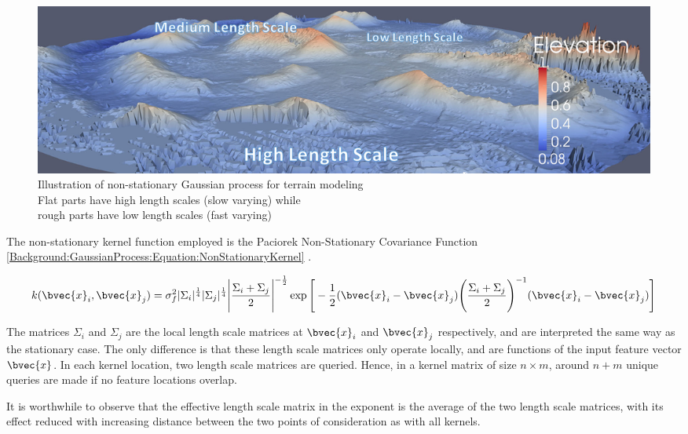 			\begin{figure}[!htbp]
				\centering
					\includegraphics[width=\textwidth]{Figures/gaussianprocesslengthscale.png}
				\caption{Illustration of non-stationary Gaussian process for terrain modeling \cite{GaussianProcessTerrainFigure} \\
				Flat parts have high length scales (slow varying) while \\ rough parts have low length scales (fast varying)}
				\label{Background:GaussianProcess:Figure:gaussianprocesslengthscale}
			\end{figure}
			
			The non-stationary kernel function employed is the Paciorek Non-Stationary Covariance Function \eqref{Background:GaussianProcess:Equation:NonStationaryKernel} \cite{AdaptiveNonStationaryKernel}.
			
			\begin{equation}
				k(\bvec{x}_{i}, \bvec{x}_{j}) = \sigma_{f}^{2} |\Sigma_{i}|^{\frac{1}{4}} |\Sigma_{j}|^{\frac{1}{4}} \Bigg|\frac{\Sigma_{i} + \Sigma_{j}}{2}\Bigg|^{-\frac{1}{2}} \exp\Bigg[ -\frac{1}{2} (\bvec{x}_{i} - \bvec{x}_{j}) \Bigg(\frac{\Sigma_{i} + \Sigma_{j}}{2}\Bigg)^{-1} (\bvec{x}_{i} - \bvec{x}_{j}) \Bigg]
			\label{Background:GaussianProcess:Equation:NonStationaryKernel}
			\end{equation}			
			
			The matrices $\Sigma_{i}$ and $\Sigma_{j}$ are the local length scale matrices at $\bvec{x}_{i}$ and $\bvec{x}_{j}$ respectively, and are interpreted the same way as the stationary case. The only difference is that these length scale matrices only operate locally, and are functions of the input feature vector $\bvec{x}$. In each kernel location, two length scale matrices are queried. Hence, in a kernel matrix of size $n \times m$, around $n + m$ unique queries are made if no feature locations overlap.
			
			It is worthwhile to observe that the effective length scale matrix in the exponent is the average of the two length scale matrices, with its effect reduced with increasing distance between the two points of consideration as with all kernels.
			
